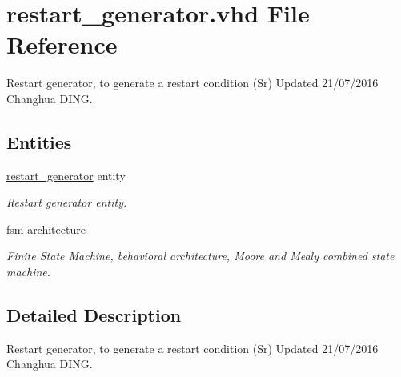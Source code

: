 \hypertarget{restart__generator_8vhd}{}\section{restart\+\_\+generator.\+vhd File Reference}
\label{restart__generator_8vhd}


Restart generator, to generate a restart condition (Sr) Updated 21/07/2016 Changhua D\+I\+NG.  


\subsection*{Entities}
\begin{DoxyCompactItemize}
\item 
\hyperlink{classrestart__generator}{restart\+\_\+generator} entity
\begin{DoxyCompactList}\small\item\em Restart generator entity. \end{DoxyCompactList}\item 
\hyperlink{classrestart__generator_1_1fsm}{fsm} architecture
\begin{DoxyCompactList}\small\item\em Finite State Machine, behavioral architecture, Moore and Mealy combined state machine. \end{DoxyCompactList}\end{DoxyCompactItemize}


\subsection{Detailed Description}
Restart generator, to generate a restart condition (Sr) Updated 21/07/2016 Changhua D\+I\+NG. 

